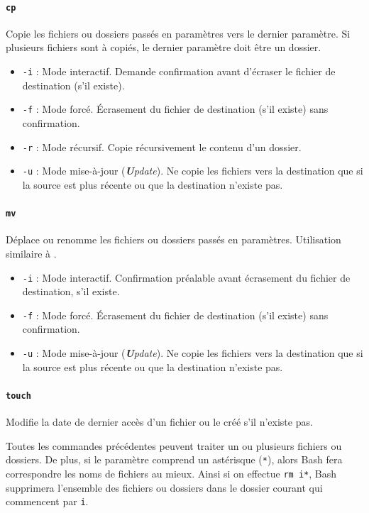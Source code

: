 \paragraph{\texttt{cp}} 
Copie les fichiers ou dossiers passés en paramètres vers le dernier paramètre. Si plusieurs fichiers sont à copiés, le dernier paramètre doit être un dossier.
\begin{itemize}
    \item \texttt{-i} : Mode interactif. Demande confirmation avant d'écraser le fichier de destination (s'il existe).
    \item \texttt{-f} : Mode forcé. Écrasement du fichier de destination (s'il existe) sans confirmation.
    \item \texttt{-r} : Mode récursif. Copie récursivement le contenu d'un dossier.
    \item \texttt{-u} : Mode mise-à-jour (\textit{\textbf{U}pdate}). Ne copie les fichiers vers la destination que si la source est plus récente ou que la destination n'existe pas.
\end{itemize}

\paragraph{\texttt{mv}} 
Déplace ou renomme les fichiers ou dossiers passés en paramètres. Utilisation similaire à .
\begin{itemize}
    \item \texttt{-i} : Mode interactif. Confirmation préalable avant écrasement du fichier de destination, s'il existe.
    \item \texttt{-f} : Mode forcé. Écrasement du fichier de destination (s'il existe) sans confirmation.
    \item \texttt{-u} : Mode mise-à-jour (\textit{\textbf{U}pdate}). Ne copie les fichiers vers la destination que si la source est plus récente ou que la destination n'existe pas.
\end{itemize}

\paragraph{\texttt{touch}} 
Modifie la date de dernier accès d'un fichier ou le créé s'il n'existe pas.

Toutes les commandes précédentes peuvent traiter un ou plusieurs fichiers ou dossiers. De plus, si le paramètre comprend un astérisque (\texttt{*}), alors Bash fera correspondre les noms de fichiers au mieux. Ainsi si on effectue \texttt{rm i*}, Bash supprimera l'ensemble des fichiers ou dossiers dans le dossier courant qui commencent par \texttt{i}.

